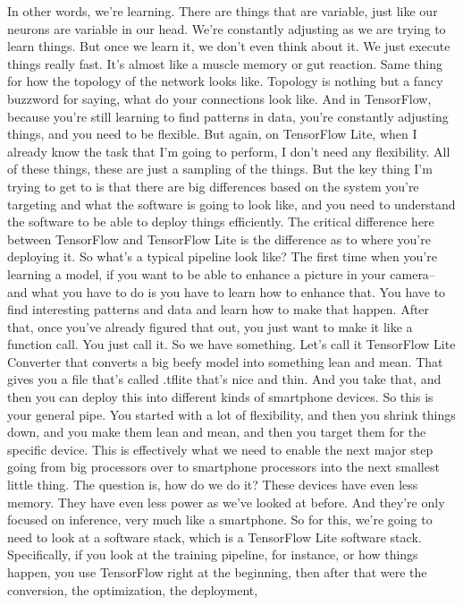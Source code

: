 In other words, we're learning.
There are things that are variable, just like our neurons are
variable in our head.
We're constantly adjusting as we are trying to learn things.
But once we learn it, we don't even think about it.
We just execute things really fast.
It's almost like a muscle memory or gut reaction.
Same thing for how the topology of the network looks like.
Topology is nothing but a fancy buzzword for saying,
what do your connections look like.
And in TensorFlow, because you're still learning to find patterns in data,
you're constantly adjusting things, and you need to be flexible.
But again, on TensorFlow Lite, when I already
know the task that I'm going to perform, I don't need any flexibility.
All of these things, these are just a sampling of the things.
But the key thing I'm trying to get to is
that there are big differences based on the system you're targeting
and what the software is going to look like,
and you need to understand the software to be
able to deploy things efficiently.
The critical difference here between TensorFlow and TensorFlow Lite
is the difference as to where you're deploying it.
So what's a typical pipeline look like?
The first time when you're learning a model,
if you want to be able to enhance a picture in your camera--
and what you have to do is you have to learn how to enhance that.
You have to find interesting patterns and data
and learn how to make that happen.
After that, once you've already figured that out,
you just want to make it like a function call.
You just call it.
So we have something.
Let's call it TensorFlow Lite Converter that
converts a big beefy model into something lean and mean.
That gives you a file that's called .tflite that's nice and thin.
And you take that, and then you can deploy this
into different kinds of smartphone devices.
So this is your general pipe.
You started with a lot of flexibility, and then you shrink things down,
and you make them lean and mean, and then
you target them for the specific device.
This is effectively what we need to enable the next major step going
from big processors over to smartphone processors
into the next smallest little thing.
The question is, how do we do it?
These devices have even less memory.
They have even less power as we've looked at before.
And they're only focused on inference, very much like a smartphone.
So for this, we're going to need to look at a software stack, which
is a TensorFlow Lite software stack.
Specifically, if you look at the training pipeline, for instance,
or how things happen, you use TensorFlow right at the beginning,
then after that were the conversion, the optimization, the deployment,
